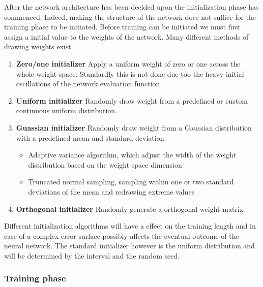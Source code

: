 \documentclass[]{article}
\begin{document}
After the network architecture has been decided upon the initialization phase has commenced. Indeed, making the structure of the network does not suffice for the training phase to be initiated. Before training can be initiated we must first assign a initial value to the weights of the network. Many different methods of drawing weights exist
\begin{enumerate}
	\item \textbf{Zero/one initializer} Apply a uniform weight of zero or one across the whole weight space. Standardly this is not done due too the heavy initial oscillations of the network evaluation function
	\item \textbf{Uniform initializer} Randomly draw weight from a predefined or custom continuous uniform distribution.
	\item \textbf{Guassian initializer} Randomly draw weight from a Gaussian distribution with a predefined mean and standard deviation.
		\begin{itemize}
			\item Adaptive variance algorithm, which adjust the width of the weight distribution based on the weight space dimension
			\item Truncated normal sampling, sampling within one or two standard deviations of the mean and redrawing extreme values
		\end{itemize} 
	\item \textbf{Orthogonal initializer} Randomly generate a orthogonal weight matrix 
\end{enumerate}
Different initialization algorithms will have a effect on the training length and in case of a complex error surface possibly affects the eventual outcome of the neural network. The standard initializer however is the uniform distribution and will be determined by the interval and the random seed.

\subsubsection{Training phase}
\end{document}

